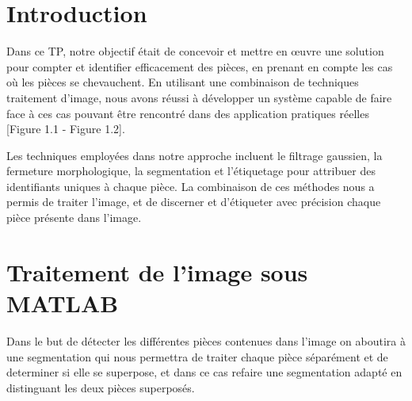 \documentclass[11pt, openright]{book}
\begin{document}
        

        
	
    \newpage

    \section{Introduction}

		Dans ce TP, notre objectif était de concevoir et mettre en œuvre une solution pour compter et identifier efficacement des pièces, en prenant en compte les cas où les pièces se chevauchent. En utilisant une combinaison de techniques traitement d'image, nous avons réussi à développer un système capable de faire face à ces cas pouvant être rencontré dans des application pratiques réelles [Figure 1.1 - Figure 1.2].

		Les techniques employées dans notre approche incluent le filtrage gaussien, la fermeture morphologique, la segmentation et l'étiquetage  pour attribuer des identifiants uniques à chaque pièce. La combinaison de ces méthodes nous a permis de traiter l'image, et de discerner et d'étiqueter avec précision chaque pièce présente dans l'image.
	
		\begin{figure}[ht!]
			\begin{floatrow}


			\end{floatrow}
		\end{figure}

	\section{Traitement de l'image sous MATLAB}
		
		Dans le but de détecter les différentes pièces contenues dans l'image on aboutira à une segmentation qui nous permettra de traiter chaque pièce séparément et de determiner si elle se superpose, et dans ce cas refaire une segmentation adapté en distinguant les deux pièces superposés.
\end{document}
